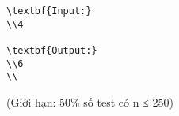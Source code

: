 \begin{verbatim}
\textbf{Input:}
\\4

\textbf{Output:}
\\6
\\\end{verbatim}

   (Giới hạn: 50\% số test có n ≤ 250)